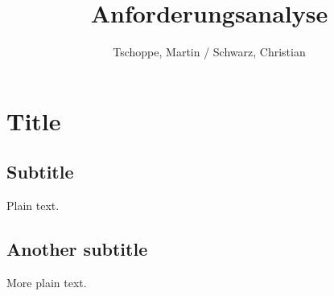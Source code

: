 \documentclass{article}
\title{Anforderungsanalyse}
\author{Tschoppe, Martin / Schwarz, Christian}
\begin{document}
\maketitle
\newpage
\tableofcontents
\newpage

\section{Title}

\subsection{Subtitle}

Plain text.

\subsection{Another subtitle}

More plain text.
\end{document}
